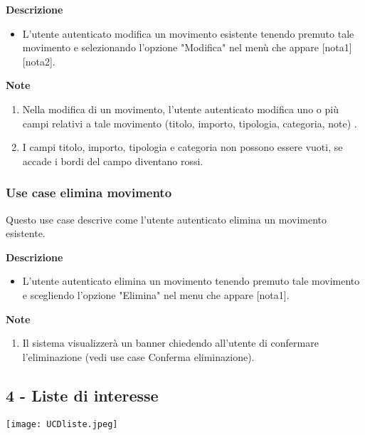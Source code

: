 \documentclass[a4paper,12pt]{article}
\begin{document}
\textbf{Descrizione}
\begin{itemize} \setlength\itemsep{0.01em}
\item L'utente autenticato modifica un movimento esistente tenendo premuto tale movimento e selezionando l'opzione "Modifica" nel menù che appare [nota1] [nota2].
\end{itemize}

\textbf{Note}
\begin{enumerate} \setlength\itemsep{0.01em}
\item Nella modifica di un movimento, l'utente autenticato modifica uno o più campi relativi a tale movimento (titolo, importo, tipologia, categoria, note) .
\item I campi titolo, importo, tipologia e categoria non possono essere vuoti, se accade i bordi del campo diventano rossi.
\end{enumerate}



\subsubsection*{Use case elimina movimento}

Questo use case descrive come l'utente autenticato elimina un movimento esistente.

\textbf{Descrizione}
\begin{itemize} \setlength\itemsep{0.01em}
\item L'utente autenticato elimina un movimento tenendo premuto tale movimento e scegliendo l'opzione "Elimina" nel menu che appare [nota1].
\end{itemize}

\textbf{Note}
\begin{enumerate} \setlength\itemsep{0.01em}
\item Il sistema visualizzerà un banner chiedendo all'utente di confermare l'eliminazione  (vedi use case Conferma eliminazione).
\end{enumerate}



\subsection*{4 - Liste di interesse}

\begin{center}
  \texttt{[image: UCDliste.jpeg]}
\end{center}
\end{document}
